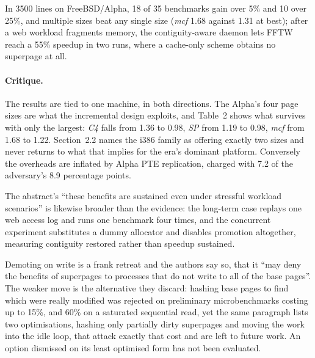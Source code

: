 In 3500 lines on FreeBSD/Alpha, 18 of 35 benchmarks gain over 5\% and 10 over 25\%, and
multiple sizes beat any single size (\emph{mcf} 1.68 against 1.31 at best); after a web
workload fragments memory, the contiguity-aware daemon lets FFTW reach a 55\% speedup in
two runs, where a cache-only scheme obtains no superpage at all.

\paragraph{Critique.}
The results are tied to one machine, in both directions. The Alpha's four page sizes are
what the incremental design exploits, and Table~2 shows what survives with only the
largest: \emph{C4} falls from 1.36 to 0.98, \emph{SP} from 1.19 to 0.98, \emph{mcf} from
1.68 to 1.22. Section~2.2 names
the i386 family as offering exactly two sizes and never returns to what that implies for
the era's dominant platform. Conversely the overheads are inflated by Alpha PTE
replication, charged with 7.2 of the adversary's 8.9 percentage points.

The abstract's ``these benefits are sustained even under stressful workload
scenarios'' is likewise broader than the evidence: the long-term case replays one web access
log and runs one benchmark four
times, and the concurrent experiment substitutes a dummy allocator and disables promotion
altogether, measuring contiguity restored rather than speedup sustained.

Demoting on write is a frank retreat and the authors say so, that it ``may deny the
benefits of superpages to processes that do not write to all of the base pages''. The
weaker move is the alternative they discard: hashing base pages to find which were really
modified was rejected on preliminary microbenchmarks costing up to 15\%, and 60\% on a
saturated sequential read, yet the same paragraph lists two optimisations, hashing only
partially dirty superpages and moving the
work into the idle loop, that attack exactly that cost and are left to future work. An
option dismissed on its least optimised form has not been evaluated.
